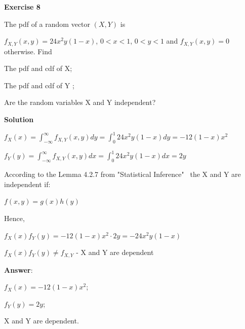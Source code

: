 \documentclass[12pt]{article}
\theoremstyle{definiton}
\theoremstyle{definition}
\theoremstyle{definition}
\begin{document}
		\bigskip
		\textbf{Exercise 8}

		The pdf of a random vector $(X, Y)$ is 
		
$f_{X,Y}\left(x, y\right) = 24x^2 y\left(1-x\right)$, $0<x<1$, $0<y<1$ and $f_{X,Y}\left(x, y\right) = 0$ otherwise. Find
\begin{list}{) ~}{}
\item The pdf and cdf of X;
\item The pdf and cdf of Y ;
\item Are the random variables X and Y independent?
\end{list}
		\medskip
		
		\textbf{Solution}
\begin{list}{) ~}{}		
		\item $f_X(x) = \int_{-\infty}^{\infty} f_{X,Y}(x,y)dy = \int_0^1 24x^2 y\left(1-x\right)dy=-12\left(1-x\right)x^2$
		
		\item $f_Y(y) = \int_{-\infty}^{\infty} f_{X,Y}(x,y)dx = \int_0^1 24x^2 y\left(1-x\right)dx=2y$
		
		\item According to the Lemma 4.2.7 from "Statistical Inference"    \ the X and Y are independent if:
		
		$f(x,y) = g(x)h(y)$
		
		Hence, 
		
		$f_X(x)f_Y(y) = -12\left(1-x\right)x^2 \cdot 2y = -24x^2 y\left(1-x\right)$
		
		$f_X(x)f_Y(y) \neq f_{X, Y}$ - X and Y are dependent
		
\end{list}

		\medskip
		\textbf{Answer}:		
\begin{list}{) ~}{}			
		\item $f_X(x)= -12\left(1-x\right)x^2$;
		
		\item $f_Y(y) =2y$;
		
		\item X and Y are dependent.
\end{list}
\end{document}
